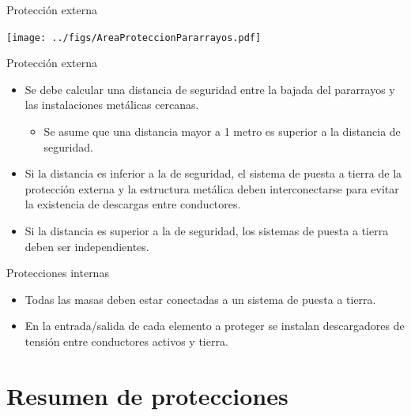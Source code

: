 \documentclass[aspectratio=169, usenames,svgnames,dvipsnames]{beamer}
\begin{document}
\begin{frame}[label={sec:org8f4c818}]{Protección externa}
\begin{center}
\texttt{[image: ../figs/AreaProteccionPararrayos.pdf]}
\end{center}
\end{frame}

\begin{frame}[label={sec:org8408998}]{Protección externa}
\begin{itemize}
\item Se debe calcular una \alert{distancia de seguridad} entre la bajada del
pararrayos y las instalaciones metálicas cercanas.

\begin{itemize}
\item Se asume que una distancia mayor a 1 metro es superior a la distancia
de seguridad.
\end{itemize}

\item \alert{Si la distancia es inferior a la de seguridad}, el sistema de puesta
a tierra de la protección externa y la estructura metálica deben
\alert{interconectarse} para evitar la existencia de descargas entre
conductores.

\item \alert{Si la distancia es superior a la de seguridad}, los sistemas de
puesta a tierra deben ser \alert{independientes}.
\end{itemize}
\end{frame}

\begin{frame}[label={sec:org780e945}]{Protecciones internas}
\begin{itemize}
\item \alert{Todas las masas deben estar conectadas a un sistema de puesta a
tierra}.

\item En la entrada/salida de cada elemento a proteger se instalan
\alert{descargadores de tensión} entre conductores activos y
tierra.
\end{itemize}
\end{frame}

\section{Resumen de protecciones}
\label{sec:org1c769e7}
\end{document}
